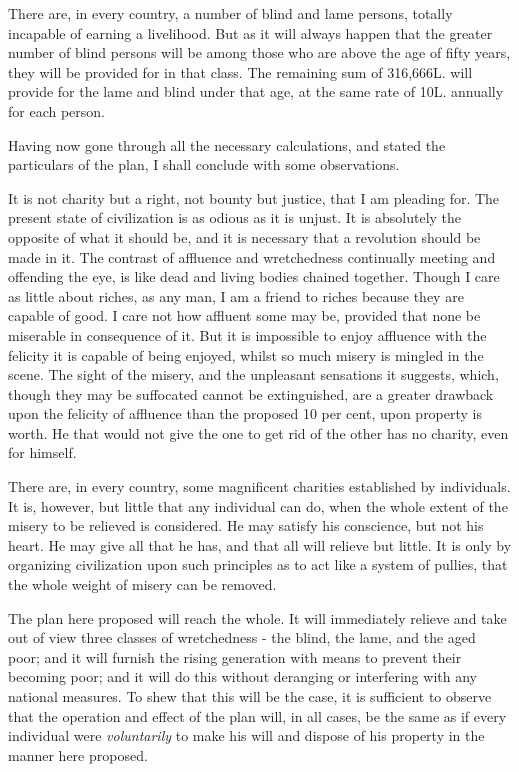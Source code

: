 There are, in every country, a number of blind and lame persons, totally incapable of earning a livelihood. But as it will always happen that the greater number of blind persons will be among those who are above the age of fifty years, they will be provided for in that class. The remaining sum of 316,666L. will provide for the lame and blind under that age, at the same rate of 10L. annually for each person.\par

Having now gone through all the necessary calculations, and stated the particulars of the plan, I shall conclude with some observations.\par

It is not charity but a right, not bounty but justice, that I am pleading for. The present state of civilization is as odious as it is unjust. It is absolutely the opposite of what it should be, and it is necessary that a revolution should be made in it. The contrast of affluence and wretchedness continually meeting and offending the eye, is like dead and living bodies chained together. Though I care as little about riches, as any man, I am a friend to riches because they are capable of good. I care not how affluent some may be, provided that none be miserable in consequence of it. But it is impossible to enjoy affluence with the felicity it is capable of being enjoyed, whilst so much misery is mingled in the scene. The sight of the misery, and the unpleasant sensations it suggests, which, though they may be suffocated cannot be extinguished, are a greater drawback upon the felicity of affluence than the proposed 10 per cent, upon property is worth. He that would not give the one to get rid of the other has no charity, even for himself.\par

There are, in every country, some magnificent charities established by individuals. It is, however, but little that any individual can do, when the whole extent of the misery to be relieved is considered. He may satisfy his conscience, but not his heart. He may give all that he has, and that all will relieve but little. It is only by organizing civilization upon such principles as to act like a system of pullies, that the whole weight of misery can be removed.\par

The plan here proposed will reach the whole. It will immediately relieve and take out of view three classes of wretchedness - the blind, the lame, and the aged poor; and it will furnish the rising generation with means to prevent their becoming poor; and it will do this without deranging or interfering with any national measures. To shew that this will be the case, it is sufficient to observe that the operation and effect of the plan will, in all cases, be the same as if every individual were \textit{voluntarily} to make his will and dispose of his property in the manner here proposed.\par

